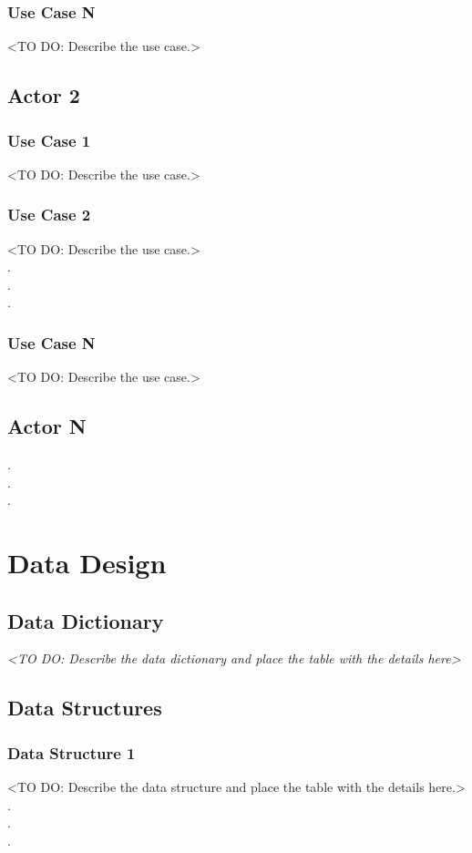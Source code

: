 \documentclass[12pt,a4paper]{report}
\begin{document}
\subsection{Use Case N}
<TO DO: Describe the use case.>

\section{Actor 2} 
\subsection{Use Case 1}
<TO DO: Describe the use case.>
\subsection{Use Case 2}
<TO DO: Describe the use case.> \\
\hspace*{3cm} . \\
\hspace*{3cm} . \\
\hspace*{3cm} .
\subsection{Use Case N}
<TO DO: Describe the use case.>

\section{Actor N}
\hspace*{1.5cm} . \\
\hspace*{1.5cm} . \\
\hspace*{1.5cm} .

\chapter{Data Design}
\section{Data Dictionary}
\textit{<TO DO: Describe the data dictionary and place the table with the details here>}

\section{Data Structures}
\subsection{Data Structure 1}
<TO DO: Describe the data structure and place the table with the details here.> \\
\hspace*{3cm} . \\
\hspace*{3cm} . \\
\hspace*{3cm} . 
\end{document}
